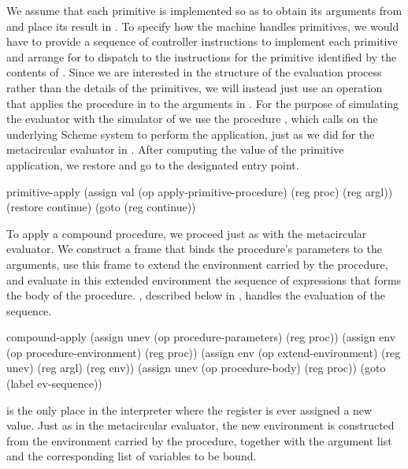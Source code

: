 \noindent
We assume that each primitive is implemented so as to obtain its arguments from
 and place its result in .  To specify how the machine
handles primitives, we would have to provide a sequence of controller
instructions to implement each primitive and arrange for 
to dispatch to the instructions for the primitive identified by the contents of
.  Since we are interested in the structure of the evaluation
process rather than the details of the primitives, we will instead just use an
 operation that applies the procedure in
 to the arguments in .  For the purpose of simulating the
evaluator with the simulator of  we use the procedure
, which calls on the underlying Scheme system
to perform the application, just as we did for the metacircular evaluator in
.  After computing the value of the primitive application,
we restore  and go to the designated entry point.

\begin{codeBlock}
primitive-apply
  (assign val (op apply-primitive-procedure)
              (reg proc)
              (reg argl))
  (restore continue)
  (goto (reg continue))
\end{codeBlock}

\noindent
To apply a compound procedure, we proceed just as with the metacircular
evaluator.  We construct a frame that binds the procedure's parameters to the
arguments, use this frame to extend the environment carried by the procedure,
and evaluate in this extended environment the sequence of expressions that
forms the body of the procedure.  , described below in
, handles the evaluation of the sequence.

\begin{codeBlock}
compound-apply
  (assign unev (op procedure-parameters) (reg proc))
  (assign env (op procedure-environment) (reg proc))
  (assign env (op extend-environment)
              (reg unev) (reg argl) (reg env))
  (assign unev (op procedure-body) (reg proc))
  (goto (label ev-sequence))
\end{codeBlock}

\noindent
{} is the only place in the interpreter where the 
register is ever assigned a new value.  Just as in the metacircular evaluator,
the new environment is constructed from the environment carried by the
procedure, together with the argument list and the corresponding list of
variables to be bound.

